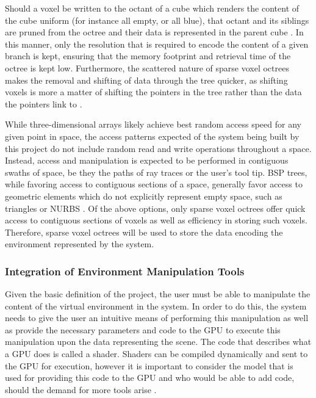 \documentclass[onecolumn, draftclsnofoot,10pt, compsoc]{IEEEtran}
\newcounter{threesection}[subsubsection]
\begin{document}
Should a voxel be written to the octant of a cube which renders the content of the cube uniform (for instance all empty, or all blue), that octant and its siblings are pruned from the octree and their data is represented in the parent cube \cite{braxTech3}.
In this manner, only the resolution that is required to encode the content of a given branch is kept, ensuring that the memory footprint and retrieval time of the octree is kept low.
Furthermore, the scattered nature of sparse voxel octrees makes the removal and shifting of data through the tree quicker, as shifting voxels is more a matter of shifting the pointers in the tree rather than the data the pointers link to \cite{braxTech3}.



While three-dimensional arrays likely achieve best random access speed for any given point in space, the access patterns expected of the system being built by this project do not include random read and write operations throughout a space.
Instead, access and manipulation is expected to be performed in contiguous swaths of space, be they the paths of ray traces or the user's tool tip.
BSP trees, while favoring access to contiguous sections of a space, generally favor access to geometric elements which do not explicitly represent empty space, such as triangles or NURBS \cite{braxTech5}.
Of the above options, only sparse voxel octrees offer quick access to contiguous sections of voxels as well as efficiency in storing such voxels.
Therefore, sparse voxel octrees will be used to store the data encoding the environment represented by the system.


\subsubsection{Integration of Environment Manipulation Tools}

Given the basic definition of the project, the user must be able to manipulate the content of the virtual environment in the system.
In order to do this, the system needs to give the user an intuitive means of performing this manipulation as well as provide the necessary parameters and code to the GPU to execute this manipulation upon the data representing the scene.
The code that describes what a GPU does is called a shader.
Shaders can be compiled dynamically and sent to the GPU for execution, however it is important to consider the model that is used for providing this code to the GPU and who would be able to add code, should the demand for more tools arise \cite{braxTech4}.
\end{document}
